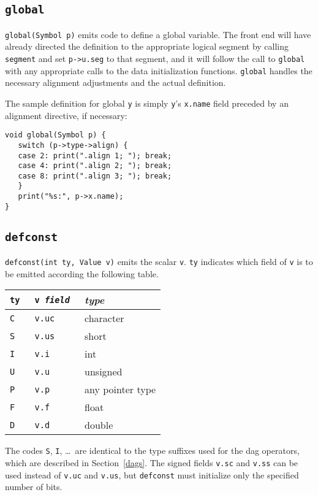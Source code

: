 \subsection{\tt global}

\label{global}
\verb|global(Symbol p)| emits code to define a global variable.
The front end will have already directed the definition
to the appropriate logical segment by calling \verb|segment| and
set \verb|p->u.seg| to that segment,
and it will follow the call to \verb|global|
with any appropriate calls to the data initialization functions.
\verb|global| handles the necessary alignment adjustments and
the actual definition.

The sample definition for global \verb|y| is simply
\verb|y|'s \verb|x.name| field preceded by an alignment directive, if necessary:
\begin{verbatim}
void global(Symbol p) {
   switch (p->type->align) {
   case 2: print(".align 1; "); break;
   case 4: print(".align 2; "); break;
   case 8: print(".align 3; "); break;
   }
   print("%s:", p->x.name);
}
\end{verbatim}

\subsection{\tt defconst}

\label{defconst}

\verb|defconst(int ty, Value v)| emits the scalar \verb|v|.
\verb|ty| indicates which field of
\verb|v| is to be emitted according the following table.

\begin{center}
\begin{tabular}{lll}
\tt ty	& \tt v \it field	& \it type \\ \hline
\tt C	& \tt v.uc		& character \\
\tt S	& \tt v.us		& short \\
\tt I	& \tt v.i		& int \\
\tt U	& \tt v.u		& unsigned \\
\tt P	& \tt v.p		& any pointer type \\
\tt F	& \tt v.f		& float \\
\tt D	& \tt v.d		& double \\
\end{tabular}
\end{center}
The codes \verb|S|, \verb|I|, \ldots\ are identical to the type suffixes
used for the dag operators, which are described in Section~\ref{dags}.
The signed fields \verb|v.sc| and \verb|v.ss| can be used instead
of \verb|v.uc| and \verb|v.us|, but \verb|defconst|
must initialize only the specified number of bits.

